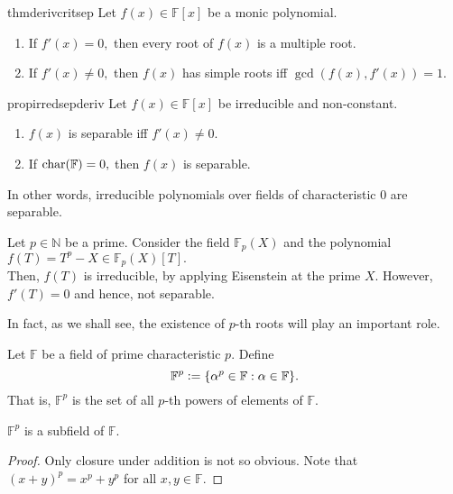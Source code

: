 \begin{restatable}{thm}{derivcritsep}
\label{thm:derivcritsep}
    Let $f(x) \in \mathbb{F}[x]$ be a monic polynomial.
    \begin{enumerate}
         \item If $f'(x) = 0,$ then every root of $f(x)$ is a multiple root.
         \item If $f'(x) \neq 0,$ then $f(x)$ has simple roots iff $\gcd(f(x), f'(x)) = 1.$ \hfill\hyperref[thm:derivcritsep2]{\downsym}
     \end{enumerate} 
\end{restatable}

\begin{restatable}[]{prop}{irredsepderiv}
\label{prop:irredsepderiv}
    Let $f(x) \in \mathbb{F}[x]$ be irreducible and non-constant.
    \begin{enumerate}
         \item $f(x)$ is separable iff $f'(x) \neq 0.$
         \item If $\operatorname{char}(\mathbb{F}) = 0,$ then $f(x)$ is separable. 
     \end{enumerate} 
     In other words, irreducible polynomials over fields of characteristic $0$ are separable. \hfill\hyperref[prop:irredsepderiv2]{\downsym}
\end{restatable}

\begin{ex}
    Let $p \in \mathbb{N}$ be a prime. Consider the field $\mathbb{F}_p(X)$ and the polynomial $f(T) = T^p - X \in \mathbb{F}_p(X)[T].$ \\
    Then, $f(T)$ is irreducible, by applying Eisenstein at the prime $X.$ However, $f'(T) = 0$ and hence, not separable.

    In fact, as we shall see, the existence of $p$-th roots will play an important role.
\end{ex}

\begin{defn}%
    Let $\mathbb{F}$ be a field of prime characteristic $p.$ Define
    \begin{equation*} 
        \mathbb{F}^p \vcentcolon= \{\alpha^p \in \mathbb{F} : \alpha \in \mathbb{F}\}.
    \end{equation*}
    That is, $\mathbb{F}^p$ is the set of all $p$-th powers of elements of $\mathbb{F}.$
\end{defn}

\begin{prop}
    $\mathbb{F}^p$ is a subfield of $\mathbb{F}.$
\end{prop}
\begin{proof} 
    Only closure under addition is not so obvious. Note that $(x + y)^p = x^p + y^p$ for all $x, y \in \mathbb{F}.$
\end{proof}

